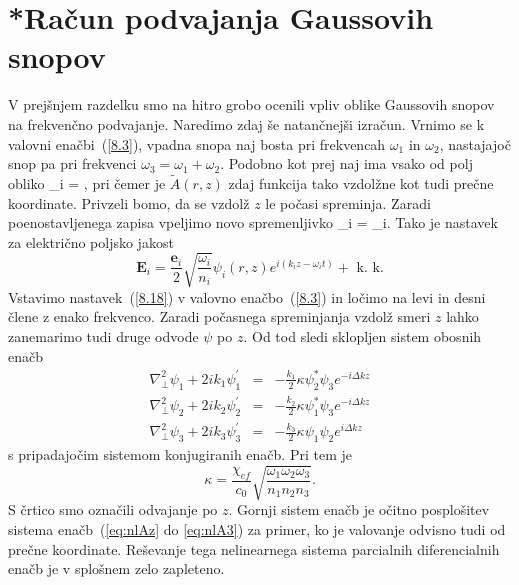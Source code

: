 \section{{*}Račun podvajanja Gaussovih snopov}
V prejšnjem razdelku smo na hitro grobo ocenili vpliv oblike Gaussovih snopov
na frekvenčno podvajanje. Naredimo zdaj še natančnejši izračun. Vrnimo se k valovni
enačbi~(\ref{8.3}), vpadna snopa naj bosta pri frekvencah
$\omega_{1}$ in $\omega_{2}$, nastajajoč snop pa pri frekvenci
$\omega_{3}=\omega_{1}+\omega_{2}$.
Podobno kot prej naj ima vsako od polj obliko 
\beq
{}_{i}  = ,
\eeq
pri čemer je $\tilde{A}(r,z)$ zdaj funkcija tako vzdolžne kot tudi prečne koordinate. Privzeli
bomo, da se vzdolž $z$ le počasi spreminja.
Zaradi poenostavljenega zapisa vpeljimo novo spremenljivko 
\beq
\psi_i = _i.
\eeq
Tako je nastavek za električno poljsko jakost
\begin{equation}
\mathbf{E}_{i}=\frac{\mathbf{e}_{i}}{2}\sqrt{\frac{\omega_{i}}{n_{i}}}\psi_{i}(r,z)
e^{i(k_{i}z-\omega_{i}t)}+\mbox{ k. k.}
\label{8.18}
\end{equation}
Vstavimo nastavek~(\ref{8.18}) v valovno
enačbo~(\ref{8.3}) in ločimo na levi in desni člene z enako frekvenco.
Zaradi počasnega spreminjanja vzdolž smeri $z$ lahko zanemarimo tudi druge odvode 
$\psi$ po $z$. Od tod sledi sklopljen sistem obosnih enačb 
\begin{eqnarray}
\nabla_{\perp}^{2}\psi_{1}+2ik_{1}\psi_{1}^{\prime} & = & -
\frac{k_{1}}{2}\kappa\psi_{2}^{\ast}\psi_{3}e^{-i\Delta kz}\\
\nabla_{\perp}^{2}\psi_{2}+2ik_{2}\psi_{2}^{\prime} & = & -
\frac{k_{2}}{2}\kappa\psi_{1}^{\ast}\psi_{3}e^{-i\Delta kz}\\
\nabla_{\perp}^{2}\psi_{3}+2ik_{3}\psi_{3}^{\prime} & =
& - \frac{k_{3}}{2}\kappa\psi_{1}\psi_{2}e^{i\Delta kz}
\label{SHGGauss_3}
\end{eqnarray}
s pripadajočim sistemom konjugiranih enačb. Pri tem je 
\begin{equation}
\kappa=\frac{\chi_{ef}}{c_0} \sqrt{\frac{\omega_{1}\omega_{2}\omega_{3}}{n_{1}n_{2}n_{3}}}.
\label{8.20}
\end{equation}
S črtico smo označili odvajanje po $z$. Gornji sistem enačb je očitno
posplošitev sistema enačb~(\ref{eq:nlAz} do \ref{eq:nlA3}) za primer, ko je valovanje odvisno
tudi od prečne koordinate. Reševanje tega nelinearnega sistema parcialnih
diferencialnih enačb je v splošnem zelo zapleteno.

